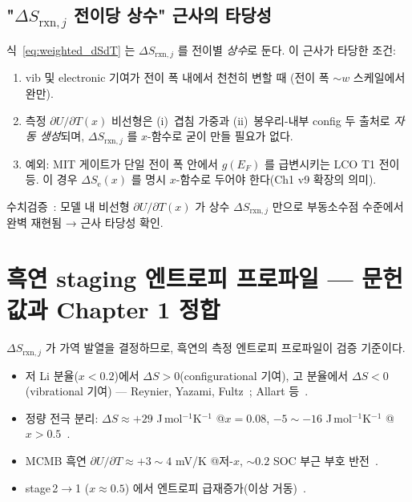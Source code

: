 \documentclass[11pt,a4paper]{article}
\newcommand{\rxn}{\mathrm{rxn}}
\newcommand{\elec}{\mathrm{e}}
\begin{document}
\subsection{"$\Delta S_{\rxn,j}$ 전이당 상수" 근사의 타당성}

식~\eqref{eq:weighted_dSdT} 는 $\Delta S_{\rxn,j}$ 를 전이별 \emph{상수}로 둔다.
이 근사가 타당한 조건:
\begin{enumerate}[leftmargin=1.6em,itemsep=2pt]
\item vib 및 electronic 기여가 전이 폭 내에서 천천히 변할 때 (전이 폭 $\sim w$ 스케일에서 완만).
\item 측정 $\partial U/\partial T(x)$ 비선형은 (i)~겹침 가중과 (ii)~봉우리-내부 config 두 출처로
  \emph{자동 생성}되며, $\Delta S_{\rxn,j}$ 를 $x$-함수로 굳이 만들 필요가 없다.
\item 예외: MIT 게이트가 단일 전이 폭 안에서 $g(E_F)$ 를 급변시키는 LCO T1 전이 등.
  이 경우 $\Delta S_\elec(x)$ 를 명시 $x$-함수로 두어야 한다(Ch1 v9 확장의 의미).
\end{enumerate}

수치검증~\cite{verif42}: 모델 내 비선형 $\partial U/\partial T(x)$ 가 상수 $\Delta S_{\rxn,j}$
만으로 부동소수점 수준에서 완벽 재현됨 → 근사 타당성 확인.

\section{흑연 staging 엔트로피 프로파일 — 문헌값과 Chapter 1 정합}\label{sec:profile}

$\Delta S_{\rxn,j}$ 가 가역 발열을 결정하므로, 흑연의 측정 엔트로피 프로파일이 검증 기준이다.

\begin{itemize}[leftmargin=1.4em,itemsep=2pt]
\item 저 Li 분율($x<0.2$)에서 $\Delta S>0$(configurational 기여), 고 분율에서 $\Delta S<0$
  (vibrational 기여) — Reynier, Yazami, Fultz~\cite{reynier2003}; Allart 등~\cite{allart2018}.
\item 정량 전극 분리: $\Delta S\approx+29$ J\,mol$^{-1}$K$^{-1}$ @$x=0.08$,
  $-5\sim-16$ J\,mol$^{-1}$K$^{-1}$ @$x>0.5$~\cite{allart2018}.
\item MCMB 흑연 $\partial U/\partial T\approx+3\sim4$ mV/K @저-$x$,
  $\sim0.2$ SOC 부근 부호 반전~\cite{msmr_partII}.
\item stage\,2$\to$1 ($x\approx0.5$) 에서 엔트로피 급재증가(이상 거동)~\cite{reynier2003,allart2018}.
\end{itemize}
\end{document}
